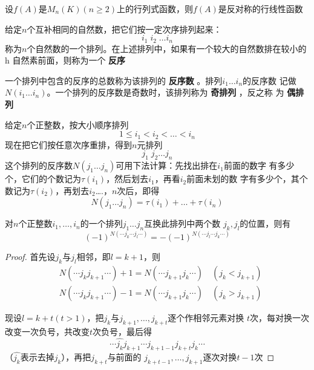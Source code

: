 \documentclass[11pt]{article}
\begin{document}
\begin{proposition}[]
设\(f(A)\)是\(M_n(K)(n\ge2)\)上的行列式函数，则\(f(A)\)是反对称的行线性函数
\end{proposition}


给定\(n\)个互补相同的自然数，把它们按一定次序排列起来：
\begin{equation*}
i_1\; i_2\;\dots i_n
\end{equation*}
称为\(n\)个自然数的一个排列。在上述排列中，如果有一个较大的自然数排在较小的 h
自然素前面，则称为一个 \textbf{反序}

一个排列中包含的反序的总数称为该排列的 \textbf{反序数} 。排列\(i_1\dots i_n\)的反序数
记做\(N(i_1\dots i_n)\)。一个排列的反序数是奇数时，该排列称为 \textbf{奇排列} ，反之称
为 \textbf{偶排列}

给定\(n\)个正整数，按大小顺序排列
\begin{equation*}
1\le i_1<i_2<\dots<i_n
\end{equation*}
现在把它们按任意次序重排，得到\(n\)元排列
\begin{equation*}
j_1\;j_2\dots j_n
\end{equation*}
这个排列的反序数\(N(j_1\dots j_n)\)可用下法计算：先找出排在\(i_1\)前面的数字
有多少个，它们的个数记为\(\tau(i_1)\)，然后划去\(i_1\)，再看\(i_2\)前面未划的数
字有多少个，其个数记为\(\tau(i_2)\)，再划去\(i_2\)\ldots{}.，\(n\)次后，即得
\begin{equation*}
N(j_1\dots j_n)=\tau(i_1)+\dots+\tau(i_n)
\end{equation*}

\begin{proposition}[]
对\(n\)个正整数\(i_1,\dots,i_n\)的一个排列\(j_1\dots j_n\)互换此排列中两个数
\(j_k,j_l\)的位置，则有
\begin{equation*}
(-1)^{N(\cdots j_k\cdots j_l\cdots)}=-(-1)^{N(\cdots j_l\cdots j_k\cdots)}
\end{equation*}
\end{proposition}

\begin{proof}
首先设\(j_k\)与\(j_l\)相邻，即\(l=k+1\)，则
\begin{align*}
&N(\cdots j_kj_{k+1}\cdots)+1=N(\cdots j_{k+1}j_k\cdots)\quad(j_k<j_{k+1})\\
&N(\cdots j_kj_{k+1}\cdots)-1=N(\cdots j_{k+1}j_k\cdots)\quad(j_k>j_{k+1})
\end{align*}

现设\(l=k+t(t>1)\)，把\(j_k\)与\(j_{k+1},\dots,j_{k+t}\)逐个作相邻元素对换
\(t\)次，每对换一次改变一次负号，共改变\(t\)次负号，最后得
\begin{equation*}
\cdots\hat{j_k}j_{k+1}\cdots j_{k+1-1}j_{k+t}j_k\cdots
\end{equation*}
（\(\hat{j_k}\)表示去掉\(j_k\)），再把\(j_{k+t}\)与前面的
\(j_{k+t-1},\dots,j_{k+1}\)逐次对换\(t-1\)次
\end{proof}
\end{document}
